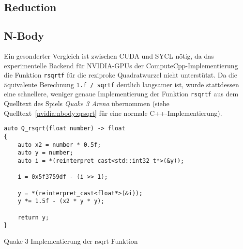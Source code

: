 \subsection{Reduction}

\subsection{N-Body}

Ein gesonderter Vergleich ist zwischen CUDA und SYCL nötig, da das
experimentelle Backend für NVIDIA-GPUs der ComputeCpp-Implementierung die
Funktion \texttt{rsqrtf} für die reziproke Quadratwurzel nicht unterstützt. Da
die äquivalente Berechnung \texttt{1.f / sqrtf} deutlich langsamer ist, wurde
stattdessen eine schnellere, weniger genaue Implementierung der Funktion
\texttt{rsqrtf} aus dem Quelltext des Spiels \textit{Quake 3 Arena} übernommen
(siehe Quelltext~\ref{nvidia:nbody:qrsqrt} für eine normale
C++-Implementierung).

\begin{code}
    \begin{verbatim}
auto Q_rsqrt(float number) -> float
{
    auto x2 = number * 0.5f;
    auto y = number;
    auto i = *(reinterpret_cast<std::int32_t*>(&y));

    i = 0x5f3759df - (i >> 1);

    y = *(reinterpret_cast<float*>(&i));
    y *= 1.5f - (x2 * y * y);

    return y;
}
    \end{verbatim}
    \caption{Quake-3-Implementierung der rsqrt-Funktion}
    \label{nvidia:nbody:qrsqrt}
\end{code}

